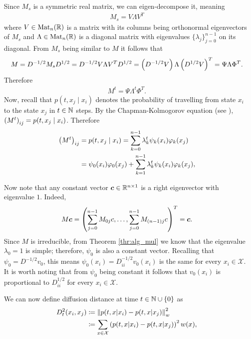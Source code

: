 Since $M_s$ is a symmetric real matrix, we can eigen-decompose it, meaning 
\begin{gather*}
    M_s=V\Lambda V^T
\end{gather*}
where $V\in\text{Mat}_n(\mathbb{R})$ is a matrix with its columns being orthonormal eigenvectors of $M_s$ and \linebreak $\Lambda\in\text{Mat}_n(\mathbb{R})$ is a diagonal matrix with eigenvalues $\{\lambda_j\}_{j=0}^{n-1}$ on its diagonal. From $M_s$ being similar to $M$ it follows that
\begin{gather*}
    M = D^{-1/2}M_sD^{1/2} = D^{-1/2}V\Lambda V^TD^{1/2} = \left( D^{-1/2}V\right)\Lambda \left( D^{1/2}V\right)^T = \Psi\Lambda\Phi^T.
\end{gather*}
Therefore 
\begin{gather*}
    M^t = \Psi\Lambda^t\Phi^T.
\end{gather*}
Now, recall that $p(t,x_j\mid x_i)$ denotes the probability of travelling from state $x_i$ to the state $x_j$ in $t\in\mathbb{N}$ steps. By the Chapman-Kolmogorov equation (see \cite[Theorem~(7), \S6.1]{thr:kolmog}), $\left( M^t\right)_{ij}=p(t,x_j\mid x_i)$.
Therefore
\begin{align*}
    \left( M^t\right)_{ij} & = p(t,x_j\mid x_i) = \sum_{k=0}^{n-1}\lambda_k^t\psi_k(x_i)\varphi_k(x_j) \\
    & = \psi_0(x_i)\varphi_0(x_j) + \sum_{k=1}^{n-1}\lambda_k^t\psi_k(x_i)\varphi_k(x_j),
\end{align*}

Now note that any constant vector $\boldsymbol{c}\in\mathbb{R}^{n\times 1}$ is a right eigenvector with eigenvalue $1$.
Indeed, 
\begin{gather*}
M\boldsymbol{c} = \left( \sum_{j=0}^{n-1} M_{0j}c,\dots,\sum_{j=0}^{n-1} M_{(n-1)j}c\right)^T = \boldsymbol{c}.
\end{gather*}
Since $M$ is irreducible, from Theorem \ref{thr:alg_mul} we know that the eigenvalue $\lambda_0=1$ is simple; therefore, $\psi_0$ is also a constant vector. Recalling that $\psi_0 = D^{-1/2}v_0$, this means $\psi_0(x_i) = D_{ii}^{-1/2}v_0(x_i)$ is the same for every $x_i\in\mathcal{X}$. It is worth noting that from $\psi_0$ being constant it follows that $v_0(x_i)$ is proportional to $D_{ii}^{1/2}$ for every $x_i\in\mathcal{X}$.

We can now define diffusion distance at time $t\in\mathbb{N}\cup\{0\}$ as
\begin{equation} \label{dif_distance}
\begin{split}
 D_t^2(x_i,x_j) & \coloneqq \left\lVert p(t,x|x_i) - p(t,x|x_j)\right\rVert_w^2\\
& \coloneqq \sum\limits_{x\in\mathcal{X}}\left( p(t,x|x_i)-p(t,x|x_j)\right)^2w(x),
\end{split}
\end{equation}

